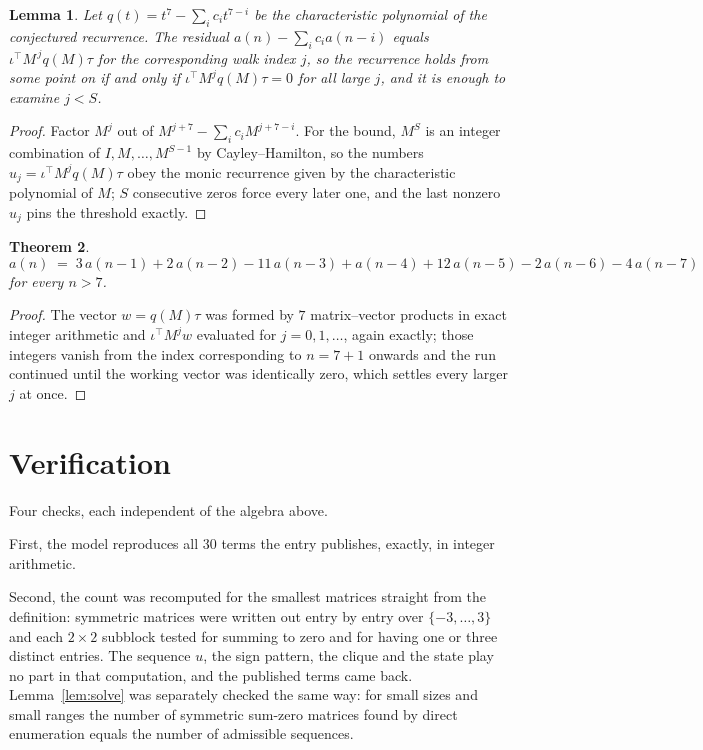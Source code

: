 \documentclass[11pt,a4paper]{article}
\theoremstyle{plain}
\newtheorem{theorem}{Theorem}
\newtheorem{lemma}[theorem]{Lemma}
\theoremstyle{definition}
\begin{document}
\begin{lemma}\label{lem:crit}
Let $q(t)=t^{7}-\sum_i c_it^{7-i}$ be the characteristic polynomial of the
conjectured recurrence. The residual $a(n)-\sum_ic_ia(n-i)$ equals
$\iota^{\!\top}M^{\,j}q(M)\tau$ for the corresponding walk index $j$, so the recurrence
holds from some point on if and only if $\iota^{\!\top}M^{j}q(M)\tau=0$ for all large $j$,
and it is enough to examine $j<S$.
\end{lemma}

\begin{proof}
Factor $M^{j}$ out of $M^{j+7}-\sum_ic_iM^{j+7-i}$. For the bound, $M^{S}$
is an integer combination of $I,M,\dots,M^{S-1}$ by Cayley--Hamilton, so the numbers
$u_j=\iota^{\!\top}M^{j}q(M)\tau$ obey the monic recurrence given by the characteristic
polynomial of $M$; $S$ consecutive zeros force every later one, and the last nonzero $u_j$
pins the threshold exactly.
\end{proof}

\begin{theorem}
\[
a(n)\;=\;3\,a(n-1) + 2\,a(n-2) - 11\,a(n-3) + a(n-4) + 12\,a(n-5) - 2\,a(n-6) - 4\,a(n-7)
\]
for every $n>7$.
\end{theorem}

\begin{proof}
The vector $w=q(M)\tau$ was formed by $7$ matrix--vector products in exact integer
arithmetic and $\iota^{\!\top}M^{j}w$ evaluated for $j=0,1,\dots$, again exactly; those
integers vanish from the index corresponding to $n=7+1$ onwards and the run continued
until the working vector was identically zero, which settles every larger $j$ at once.
\end{proof}

\section{Verification}

Four checks, each independent of the algebra above.

First, the model reproduces all $30$ terms the entry publishes, exactly, in integer
arithmetic.

Second, the count was recomputed for the smallest matrices straight from the definition:
symmetric matrices were written out entry by entry over $\{-3,\dots,3\}$ and each
$2\times2$ subblock tested for summing to zero and for having one or three distinct entries. The
sequence $u$, the sign pattern, the clique and the state play no part in that computation, and
the published terms came back. Lemma~\ref{lem:solve} was separately checked the same way: for
small sizes and small ranges the number of symmetric sum-zero matrices found by direct
enumeration equals the number of admissible sequences.
\end{document}

